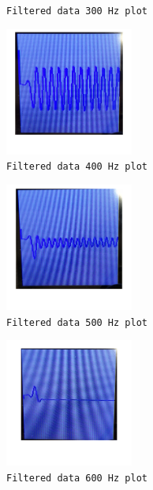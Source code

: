\documentclass[12pt]{article}
\begin{document}
\begin{enumerate}
\begin{paracol}{2}
\begin{figure}[h!]
      \caption{\texttt{Filtered data 300 Hz plot}}
      \label{fig:filtered_300}
    \end{figure}
    \switchcolumn
    \begin{figure}[h!]
      \includegraphics[width=0.375\textwidth]{./img/filtered_400Hz}
      \caption{\texttt{Filtered data 400 Hz plot}}
      \label{fig:filtered_400}
    \end{figure}
    \switchcolumn
    \begin{figure}[h!]
      \includegraphics[width=0.375\textwidth]{./img/filtered_500Hz}
      \caption{\texttt{Filtered data 500 Hz plot}}
      \label{fig:filtered_500}
    \end{figure}
    \switchcolumn
    \begin{figure}[h!]
      \includegraphics[width=0.375\textwidth]{./img/filtered_600Hz}
      \caption{\texttt{Filtered data 600 Hz plot}}
      \label{fig:filtered_600}
    \end{figure}
    \switchcolumn
    \begin{figure}[h!]

\end{figure}
\end{paracol}
\end{enumerate}
\end{document}

